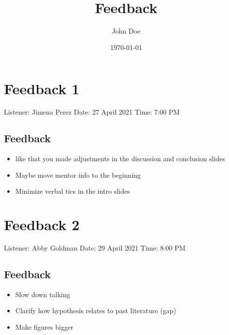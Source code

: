 \documentclass[11pt]{article}
\author{John Doe}
\date{\today}
\title{Feedback}
\begin{document}
\section{Feedback 1}
\label{sec:orgc6a0185}
Listener: Jimena Perez
Date: 27 April 2021
Time: 7:00 PM
\subsection{Feedback}
\label{sec:orgfe8d93e}
\begin{itemize}
\item like that you made adjustments in the discussion and conclusion slides
\item Maybe move mentor info to the beginning
\item Minimize verbal tics in the intro slides
\end{itemize}

\section{Feedback 2}
\label{sec:orgda324fb}
Listener: Abby Goldman
Date: 29 April 2021
Time: 8:00 PM
\subsection{Feedback}
\label{sec:org1aa22d9}
\begin{itemize}
\item Slow down talking
\item Clarify how hypothesis relates to past literature (gap)
\item Make figures bigger
\end{itemize}
\end{document}
